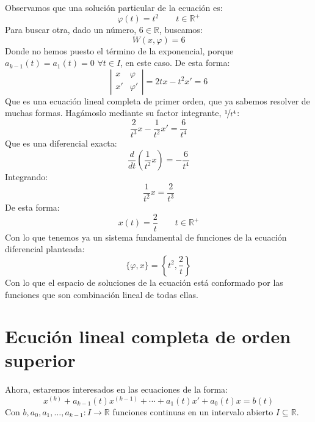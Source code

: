 \begin{ejemplo}
    Observamos que una solución particular de la ecuación es:
    \begin{equation*}
        \varphi(t) = t^2 \qquad t\in \mathbb{R}^+
    \end{equation*}
    Para buscar otra, dado un número, $6\in \mathbb{R}$, buscamos:
    \begin{equation*}
        W(x,\varphi) = 6
    \end{equation*}
    Donde no hemos puesto el término de la exponencial, porque $a_{k-1}(t) = a_1(t) = 0$ $\forall t\in I$, en este caso. De esta forma:
    \begin{equation*}
        \left|\begin{array}{cc}
            x & \varphi \\
            x' & \varphi' 
        \end{array}\right| = 2tx - t^2 x' = 6
    \end{equation*}
    Que es una ecuación lineal completa de primer orden, que ya sabemos resolver de muchas formas. Hagámoslo mediante su factor integrante, $\nicefrac{1}{t^4}$:
    \begin{equation*}
        \dfrac{2}{t^3}x - \dfrac{1}{t^2}x' = \dfrac{6}{t^4}
    \end{equation*}
    Que es una diferencial exacta:
    \begin{equation*}
        \dfrac{d}{dt}\left(\dfrac{1}{t^2}x\right) = -\dfrac{6}{t^4}
    \end{equation*}
    Integrando:
    \begin{equation*}
        \dfrac{1}{t^2}x = \dfrac{2}{t^3}
    \end{equation*}
    De esta forma:
    \begin{equation*}
        x(t) = \dfrac{2}{t} \qquad t\in \mathbb{R}^+
    \end{equation*}
    Con lo que tenemos ya un sistema fundamental de funciones de la ecuación diferencial planteada:
    \begin{equation*}
        \{\varphi, x\} = \left\{t^2, \dfrac{2}{t}\right\}
    \end{equation*}
    Con lo que el espacio de soluciones de la ecuación está conformado por las funciones que son combinación lineal de todas ellas.
\end{ejemplo}

\section{Ecución lineal completa de orden superior}
\noindent
Ahora, estaremos interesados en las ecuaciones de la forma:
\begin{equation*}
    x^{(k)} + a_{k-1}(t) x^{(k-1)} + \cdots + a_1(t) x' + a_0(t)x = b(t)
\end{equation*}
Con $b,a_0,a_1,\ldots,a_{k-1}:I\rightarrow\mathbb{R}$ funciones continuas en un intervalo abierto $I\subseteq \mathbb{R}$.\\

